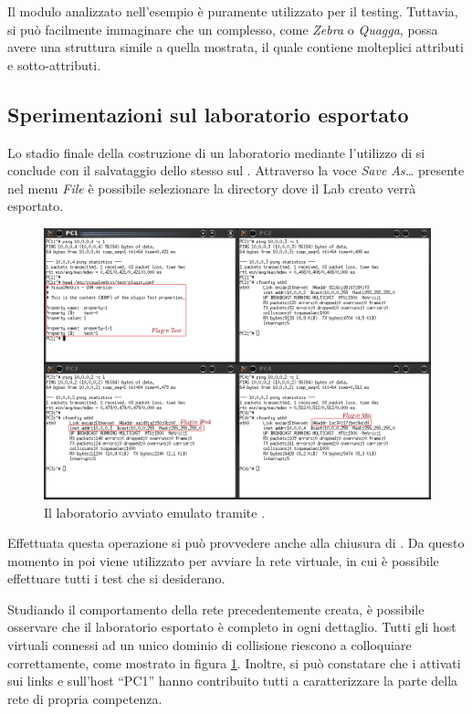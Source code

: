 Il modulo analizzato nell'esempio è puramente utilizzato per il testing. Tuttavia, si può facilmente immaginare che un \plugin{} complesso, come \emph{Zebra} o \emph{Quagga}, possa avere una struttura simile a quella mostrata, il quale contiene molteplici attributi e sotto-attributi.

\subsection{Sperimentazioni sul laboratorio esportato}
Lo stadio finale della costruzione di un laboratorio mediante l'utilizzo di \visualnetkit{} si conclude con il salvataggio dello stesso sul \fs{}. Attraverso la voce \emph{Save As\ldots} presente nel menu \emph{File} è possibile selezionare la directory dove il Lab creato verrà esportato.

\begin{figure}[!htb]
	\centering
	\includegraphics[width=13cm]{images/netkit_lab_example.png}
	\caption{Il laboratorio avviato emulato tramite \netkit{}.}
	\label{figura:ex_netkit}
\end{figure}

Effettuata questa operazione si può provvedere anche alla chiusura di \visualnetkit{}. Da questo momento in poi viene utilizzato \netkit{} per avviare la rete virtuale, in cui è possibile effettuare tutti i test che si desiderano.

Studiando il comportamento della rete precedentemente creata, è possibile osservare che il laboratorio esportato è completo in ogni dettaglio. Tutti gli host virtuali connessi ad un unico dominio di collisione riescono a colloquiare correttamente, come mostrato in figura \ref{figura:ex_netkit}. Inoltre, si può constatare che i \plugin{} attivati sui links e sull'host ``PC1'' hanno contribuito tutti a caratterizzare la parte della rete di propria competenza.

